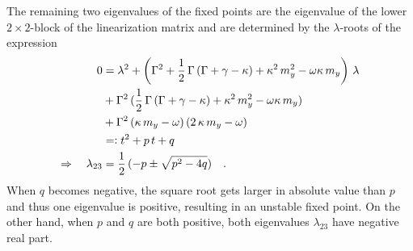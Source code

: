 The remaining two eigenvalues of the fixed points are the eigenvalue of the lower $2\times2$-block of the linearization matrix and are determined by the $\lambda$-roots of the expression
\begin{align*}
    0&=\lambda^2+\left( \Gamma^2 +\frac{1}{2}\,\Gamma\,(\Gamma+\gamma-\kappa)+\kappa^2\,m_y^2
    -\omega\kappa\,m_y\right)\,\lambda\\
    &+\Gamma^2\,(\frac{1}{2}\,\Gamma\,(\Gamma+\gamma-\kappa)+\kappa^2\,m_y^2-\omega\kappa\,m_y)\\
    &+\Gamma^2\,(\kappa\,m_y-\omega)\,(2\,\kappa\,m_y-\omega)\\
    &=\vcentcolon t^2+p\,t+q\\
    \Rightarrow\quad\lambda_{23}&=\frac{1}{2}\,(-p\pm\sqrt{p^2-4q})\quad.
\end{align*}
When $q$ becomes negative, the square root gets larger in absolute value than $p$ and thus one eigenvalue is positive, resulting in an unstable fixed point. On the other hand, when $p$ and $q$ are both positive, both eigenvalues $\lambda_{23}$ have negative real part.

